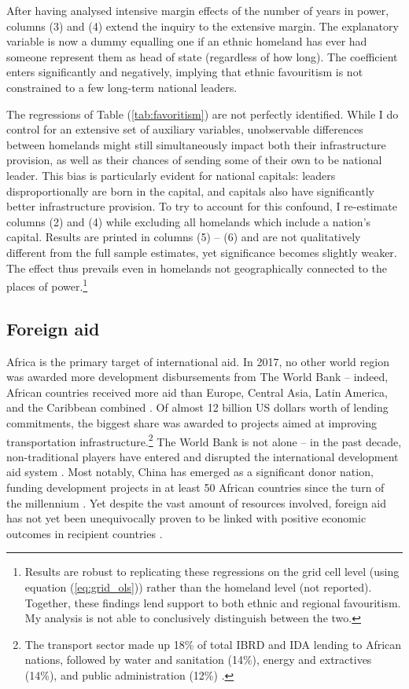 \documentclass[11pt, oneside]{article}   	%
\let\oldref\ref
\renewcommand{\ref}[1]{(\oldref{#1})}
\begin{document}
After having analysed intensive margin effects of the number of years in power, columns (3) and (4) extend the inquiry to the extensive margin. The explanatory variable is now a dummy equalling one if an ethnic homeland has ever had someone represent them as head of state (regardless of how long). The coefficient enters significantly and negatively, implying that ethnic favouritism is not constrained to a few long-term national leaders.

The regressions of Table \ref{tab:favoritism} are not perfectly identified. While I do control for an extensive set of auxiliary variables, unobservable differences between homelands might still simultaneously impact both their infrastructure provision, as well as their chances of sending some of their own to be national leader. This bias is particularly evident for national capitals: leaders disproportionally are born in the capital, and capitals also have significantly better infrastructure provision. To try to account for this confound, I re-estimate columns (2) and (4) while excluding all homelands which include a nation's capital. Results are printed in columns (5) -- (6) and are not qualitatively different from the full sample estimates, yet significance becomes slightly weaker. The effect thus prevails even in homelands not geographically connected to the places of power.\footnote{Results are robust to replicating these regressions on the grid cell level (using equation \ref{eq:grid_ols}) rather than the homeland level (not reported). Together, these findings lend support to both ethnic and regional favouritism. My analysis is not able to conclusively distinguish between the two.}

\subsection{Foreign aid}
Africa is the primary target of international aid. In 2017, no other world region was awarded more development disbursements from The World Bank -- indeed, African countries received more aid than Europe, Central Asia, Latin America, and the Caribbean combined \citep{TheWorldBank_WorldBankAnnual_2017}. Of almost 12 billion US dollars worth of lending commitments, the biggest share was awarded to projects aimed at improving transportation infrastructure.\footnote{The transport sector made up 18\% of total IBRD and IDA lending to African nations, followed by water and sanitation (14\%), energy and extractives (14\%), and public administration (12\%) \citep{TheWorldBank_WorldBankAnnual_2017}.} The World Bank is not alone -- in the past decade, non-traditional players have entered and disrupted the international development aid system \citep{Dreher_Rogueaidempirical_2015}. Most notably, China has emerged as a significant donor nation, funding development projects in at least 50 African countries since the turn of the millennium \citep{Strange_TrackingUnderreportedFinancial_2017}. Yet despite the vast amount of resources involved, foreign aid has not yet been unequivocally proven to be linked with positive economic outcomes in recipient countries \citep{Burnside_AidPoliciesGrowth_2000,Easterly_AidPoliciesGrowth_2004,Rajan_Aidgrowthwhat_2008,Clemens_CountingChickenswhen_2012,Clemens_NewRoleWorld_2016,Nunn_USFoodAid_2014}.
\end{document}
